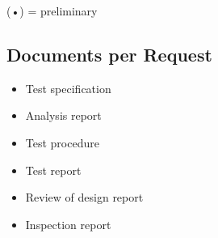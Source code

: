 (•) = preliminary

\subsection{Documents per Request}

\begin{itemize}
\item Test specification
\item Analysis report
\item Test procedure
\item Test report
\item Review of design report
\item Inspection report
\end{itemize}
